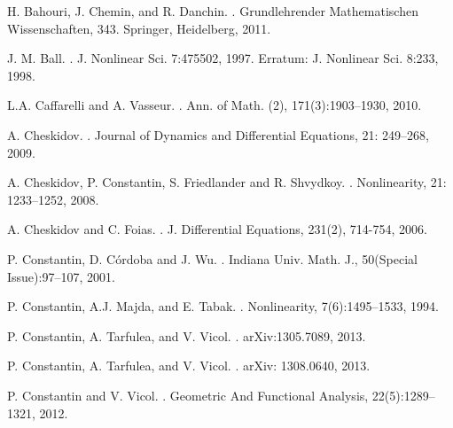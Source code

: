 \documentclass{amsart}
\numberwithin{Theorem}{section}
\theoremstyle{definition}
\theoremstyle{remark}
\begin{document}
\begin{thebibliography}{References}

H. Bahouri, J. Chemin,  and R. Danchin.
.
\newblock Grundlehrender Mathematischen Wissenschaften, 343. Springer, Heidelberg, 2011.

J. M. Ball.
.
\newblock J. Nonlinear Sci. 7:475502, 1997. Erratum: J. Nonlinear Sci. 8:233, 1998.

L.A. Caffarelli and A. Vasseur.
.
\newblock Ann. of Math. (2), 171(3):1903--1930, 2010.

A. Cheskidov.
.
\newblock Journal of Dynamics and Differential Equations, 21: 249--268, 2009.

A. Cheskidov, P. Constantin, S. Friedlander and R. Shvydkoy.
.
\newblock Nonlinearity, 21: 1233--1252, 2008.

A. Cheskidov and C. Foias.
.
\newblock J. Differential Equations, 231(2), 714-754, 2006.

P. Constantin, D. C\'ordoba and J. Wu.
.
\newblock Indiana Univ. Math. J., 50(Special Issue):97--107, 2001.

P. Constantin, A.J. Majda, and E. Tabak.
.
\newblock Nonlinearity, 7(6):1495--1533, 1994.

P. Constantin, A. Tarfulea, and V. Vicol.
.
\newblock arXiv:1305.7089, 2013.

P. Constantin, A. Tarfulea, and V. Vicol.
.
\newblock arXiv: 1308.0640, 2013.

P. Constantin and V. Vicol.
.
\newblock Geometric And Functional Analysis, 22(5):1289--1321, 2012.


\end{thebibliography}
\end{document}
